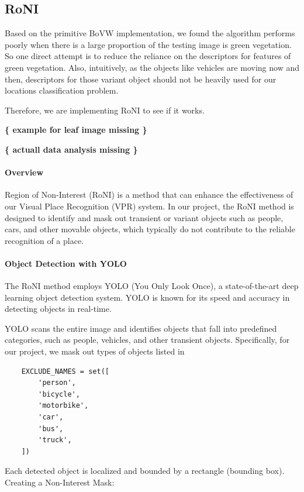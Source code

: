 \documentclass[conference]{IEEEtran}
\begin{document}
\subsection{RoNI}

Based on the primitive BoVW implementation, we found the algorithm performs poorly when there is a large proportion of the testing image is green vegetation. So one direct attempt is to reduce the reliance on the descriptors for features of green vegetation. Also, intuitively, as the objects like vehicles are moving now and then, descriptors for those variant object should not be heavily used for our locations classification problem. 

Therefore, we are implementing RoNI to see if it works.

\textbf{ \{ example for leaf image missing \} }

\textbf{ \{ actuall data analysis missing \} }

\paragraph{Overview}

Region of Non-Interest (RoNI) is a method that can enhance the effectiveness of our Visual Place Recognition (VPR) system. In our project, the RoNI method is designed to identify and mask out transient or variant objects such as people, cars, and other movable objects, which typically do not contribute to the reliable recognition of a place.

\paragraph{Object Detection with YOLO}

The RoNI method employs YOLO (You Only Look Once), a state-of-the-art deep learning object detection system. YOLO is known for its speed and accuracy in detecting objects in real-time.

YOLO scans the entire image and identifies objects that fall into predefined categories, such as people, vehicles, and other transient objects. Specifically, for our project, we mask out types of objects listed in 
\begin{verbatim}
    EXCLUDE_NAMES = set([
        'person',
        'bicycle',
        'motorbike',
        'car',
        'bus',
        'truck',
    ])
\end{verbatim}

Each detected object is localized and bounded by a rectangle (bounding box).
Creating a Non-Interest Mask:
\end{document}
